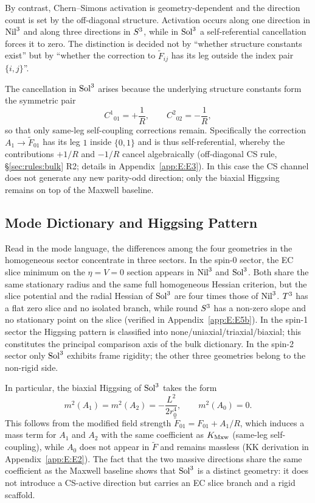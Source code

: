 By contrast, Chern--Simons activation is geometry-dependent and the direction
count is set by the off-diagonal structure.  Activation occurs along one
direction in $\mathrm{Nil}^3$ and along three directions in $S^3$, while in
$\mathrm{Sol}^3$ a self-referential cancellation forces it to zero.  The
distinction is decided not by ``whether structure constants exist'' but by
``whether the correction to $\tilde{F}_{ij}$ has its leg outside the index
pair $\{i,j\}$''.

The cancellation in $\mathrm{Sol}^3$ arises because the underlying structure
constants form the symmetric pair
\begin{equation}
  C^1{}_{01} = +\frac{1}{R}, \qquad
  C^2{}_{02} = -\frac{1}{R},
\end{equation}
so that only same-leg self-coupling corrections remain.  Specifically the
correction $A_1\to\tilde{F}_{01}$ has its leg $1$ inside $\{0,1\}$ and is thus
self-referential, whereby the contributions $+1/R$ and $-1/R$ cancel
algebraically (off-diagonal CS rule, \S\ref{sec:rules:bulk} R2; details in
Appendix~\ref{app:E:E3}).  In this case the CS channel does not generate any
new parity-odd direction; only the biaxial Higgsing remains on top of the
Maxwell baseline.

\subsection{Mode Dictionary and Higgsing Pattern}
\label{sec:baseline:dict}

Read in the mode language, the differences among the four geometries in the
homogeneous sector concentrate in three sectors.  In the spin-0 sector, the
EC slice minimum on the $\eta=V=0$ section appears in $\mathrm{Nil}^3$ and
$\mathrm{Sol}^3$.  Both share the same stationary radius and the same full
homogeneous Hessian criterion, but the slice potential and the radial Hessian
of $\mathrm{Sol}^3$ are four times those of $\mathrm{Nil}^3$.  $T^3$ has a flat
zero slice and no isolated branch, while round $S^3$ has a non-zero
slope and no stationary point on the slice (verified in
Appendix~\ref{app:E:E5b}).  In the spin-1 sector the Higgsing pattern is
classified into none/uniaxial/triaxial/biaxial; this constitutes the principal
comparison axis of the bulk dictionary.  In the spin-2 sector only
$\mathrm{Sol}^3$ exhibits frame rigidity; the other three geometries belong to the
non-rigid side.

In particular, the biaxial Higgsing of $\mathrm{Sol}^3$ takes the form
\begin{equation}
  m^2(A_1) = m^2(A_2) = -\frac{L^2}{2r_0^4}, \qquad m^2(A_0) = 0.
\end{equation}
This follows from the modified field strength
$\tilde{F}_{01} = F_{01} + A_1/R$, which induces a mass term for $A_1$ and
$A_2$ with the same coefficient as $K_{\mathrm{Mxw}}$ (same-leg self-coupling), while
$A_0$ does not appear in $\tilde{F}$ and remains massless (KK derivation in
Appendix~\ref{app:E:E2}).  The fact that the two massive directions share the
same coefficient as the Maxwell baseline shows that $\mathrm{Sol}^3$ is a distinct
geometry: it does not introduce a CS-active direction but carries an EC slice
branch and a rigid scaffold.


